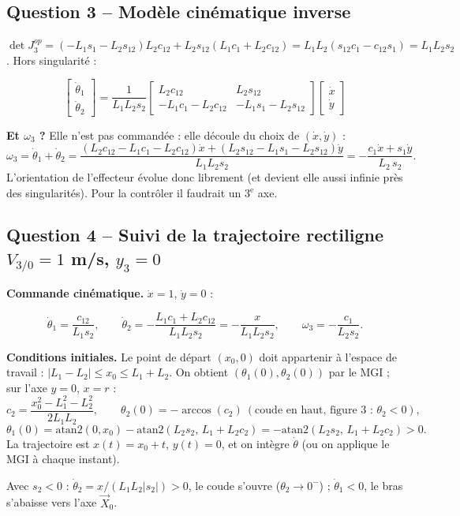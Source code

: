 \documentclass[11pt,a4paper]{article}
\newcommand{\dt}[1]{\dot\theta_{#1}}
\begin{document}
\subsection*{Question 3 -- Modèle cinématique inverse}
$\det J_3^{op}=(-L_1s_1-L_2s_{12})L_2c_{12}+L_2s_{12}(L_1c_1+L_2c_{12})=L_1L_2(s_{12}c_1-c_{12}s_1)=L_1L_2s_2$. Hors singularité :
\begin{res}
\[\begin{bmatrix}\dt1\\\dt2\end{bmatrix}=\frac{1}{L_1L_2s_2}\begin{bmatrix}L_2c_{12}&L_2s_{12}\\-L_1c_1-L_2c_{12}&-L_1s_1-L_2s_{12}\end{bmatrix}\begin{bmatrix}\dot x\\\dot y\end{bmatrix}\]
\end{res}
\textbf{Et $\omega_3$ ?} Elle n'est pas commandée : elle découle du choix de $(\dot x,\dot y)$ :
\[\omega_3=\dt1+\dt2=\frac{(L_2c_{12}-L_1c_1-L_2c_{12})\dot x+(L_2s_{12}-L_1s_1-L_2s_{12})\dot y}{L_1L_2s_2}=-\frac{c_1\dot x+s_1\dot y}{L_2\,s_2}.\]
L'orientation de l'effecteur évolue donc librement (et devient elle aussi infinie près des singularités). Pour la contrôler il faudrait un 3$^\text{e}$ axe.

\subsection*{Question 4 -- Suivi de la trajectoire rectiligne $V_{3/0}=1$ m/s, $y_3=0$}
\textbf{Commande cinématique.} $\dot x=1$, $\dot y=0$ :
\begin{res}
\[\dt1=\frac{c_{12}}{L_1s_2},\qquad \dt2=-\frac{L_1c_1+L_2c_{12}}{L_1L_2s_2}=-\frac{x}{L_1L_2s_2},\qquad \omega_3=-\frac{c_1}{L_2s_2}.\]
\end{res}
\textbf{Conditions initiales.} Le point de départ $(x_0,0)$ doit appartenir à l'espace de travail : $|L_1-L_2|\le x_0\le L_1+L_2$. On obtient $(\theta_1(0),\theta_2(0))$ par le MGI ; sur l'axe $y=0$, $x=r$ :
\[c_2=\frac{x_0^2-L_1^2-L_2^2}{2L_1L_2},\qquad \theta_2(0)=-\arccos(c_2)\ (\text{coude en haut, figure 3 : }\theta_2<0),\]
\[\theta_1(0)=\mathrm{atan2}(0,x_0)-\mathrm{atan2}(L_2s_2,\,L_1+L_2c_2)=-\mathrm{atan2}(L_2s_2,\,L_1+L_2c_2)>0.\]
La trajectoire est $x(t)=x_0+t$, $y(t)=0$, et on intègre $\dot\theta$ (ou on applique le MGI à chaque instant).

Avec $s_2<0$ : $\dt2=x/(L_1L_2|s_2|)>0$, le coude s'ouvre ($\theta_2\to0^-$) ; $\dt1<0$, le bras s'abaisse vers l'axe $\vec X_0$.
\end{document}
